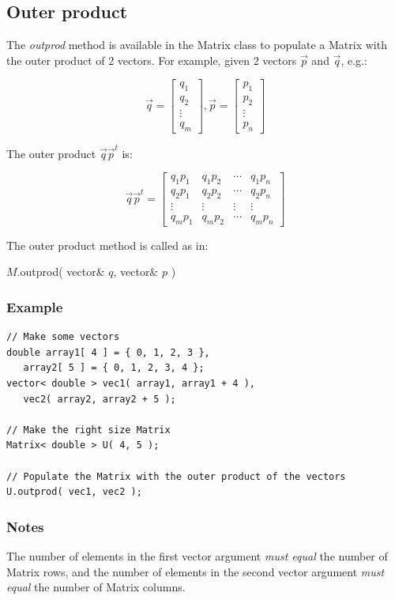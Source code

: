 \documentclass{report}
\begin{document}
\subsection{Outer product}\label{outprod}

The {\em outprod} method is available in the Matrix class to populate
a Matrix with the outer product of 2 vectors.  For example, given 2
vectors $\vec{p}$ and $\vec{q}$, e.g.:

\[
\vec{q}
=
\left[ \begin{array}{c}
	q_1 \\
	q_2 \\
	\vdots \\
	q_m
\end{array} \right]
, \vec{p} =
\left[ \begin{array}{c}
	p_1 \\
	p_2 \\
	\vdots \\
	p_n
\end{array} \right]
\]

The outer product $\vec{q}\vec{p}^t$ is:

\[
\vec{q}\vec{p}^t =
\left[ \begin{array}{cccc}
	q_1p_1 & q_1p_2 & \cdots & q_1p_n \\
	q_2p_1 & q_2p_2 & \cdots & q_2p_n \\
	\vdots & \vdots & \vdots & \vdots  \\
	q_mp_1 & q_mp_2 & \cdots & q_mp_n
\end{array} \right]
\]

The outer product method is called as in:

$M$.outprod( vector\& $q$, vector\& $p$ )

\subsubsection{Example}

\begin{verbatim}
// Make some vectors
double array1[ 4 ] = { 0, 1, 2, 3 },
   array2[ 5 ] = { 0, 1, 2, 3, 4 };
vector< double > vec1( array1, array1 + 4 ),
   vec2( array2, array2 + 5 );

// Make the right size Matrix
Matrix< double > U( 4, 5 );

// Populate the Matrix with the outer product of the vectors
U.outprod( vec1, vec2 );
\end{verbatim}

\subsubsection{Notes}
The number of elements in the first vector argument {\em must equal}
the number of Matrix rows, and the number of elements in the second
vector argument {\em must equal} the number of Matrix columns.
\end{document}
